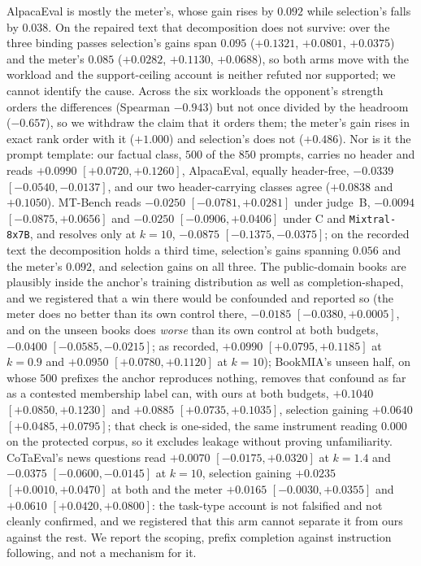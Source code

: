 AlpacaEval is mostly the meter's, whose gain rises by $0.092$ while selection's falls by $0.038$. On the repaired text that decomposition does not survive: over the three binding passes selection's gains span $0.095$ ($+0.1321$, $+0.0801$, $+0.0375$) and the meter's $0.085$ ($+0.0282$, $+0.1130$, $+0.0688$), so both arms move with the workload and the support-ceiling account is neither refuted nor supported; we cannot identify the cause. Across the six workloads the opponent's strength orders the differences (Spearman $-0.943$) but not once divided by the headroom ($-0.657$), so we withdraw the claim that it orders them; the meter's gain rises in exact rank order with it ($+1.000$) and selection's does not ($+0.486$). Nor is it the prompt template: our factual class, $500$ of the $850$ prompts, carries no header and reads $+0.0990$ $[+0.0720, +0.1260]$, AlpacaEval, equally header-free, $-0.0339$ $[-0.0540, -0.0137]$, and our two header-carrying classes agree ($+0.0838$ and $+0.1050$). MT-Bench reads $-0.0250$ $[-0.0781, +0.0281]$ under judge~B, $-0.0094$ $[-0.0875, +0.0656]$ and $-0.0250$ $[-0.0906, +0.0406]$ under C and \texttt{Mixtral-8x7B}, and resolves only at $k=10$, $-0.0875$ $[-0.1375, -0.0375]$; on the recorded text the decomposition holds a third time, selection's gains spanning $0.056$ and the meter's $0.092$, and selection gains on all three. The
public-domain books are plausibly inside the anchor's training distribution as well as completion-shaped,
and we registered that a win there would be confounded and reported so (the meter does no better than its own control there, $-0.0185$ $[-0.0380, +0.0005]$, and on the unseen books does \emph{worse} than its own control at both budgets, $-0.0400$ $[-0.0585, -0.0215]$; as recorded, $+0.0990$ $[+0.0795, +0.1185]$ at $k=0.9$ and $+0.0950$ $[+0.0780, +0.1120]$ at $k=10$); BookMIA's unseen half, on whose
$500$ prefixes the anchor reproduces nothing, removes that confound as far as a contested membership label can, with ours at both budgets, $+0.1040$ $[+0.0850, +0.1230]$ and $+0.0885$ $[+0.0735, +0.1035]$, selection gaining $+0.0640$ $[+0.0485, +0.0795]$; that check is one-sided, the same instrument reading $0.000$ on the protected corpus, so it excludes leakage without proving unfamiliarity. CoTaEval's news questions read $+0.0070$ $[-0.0175, +0.0320]$ at $k=1.4$ and $-0.0375$ $[-0.0600, -0.0145]$ at $k=10$, selection gaining $+0.0235$ $[+0.0010, +0.0470]$ at both and the meter $+0.0165$ $[-0.0030, +0.0355]$ and $+0.0610$ $[+0.0420, +0.0800]$: the task-type account is not falsified and not cleanly confirmed, and we registered that this arm cannot separate it from ours against the rest. We report the scoping, prefix completion against instruction following, and not a mechanism for it.
